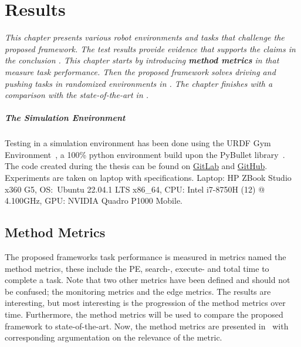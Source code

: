 \chapter{Results}%
\label{chap:results}
\textit{This chapter presents various robot environments and tasks that challenge the proposed framework. The test results provide evidence that supports the claims in the conclusion . This chapter starts by introducing \textbf{method metrics} in  that measure task performance. Then the proposed framework solves driving and pushing tasks in randomized environments in . The chapter finishes with a comparison with the state-of-the-art in .\bs}

\paragraph{The Simulation Environment}
Testing in a simulation environment has been done using the URDF Gym Environment~\cite{spahn_urdfenvironment_2022}, a 100\% python environment build upon the PyBullet library~\cite{coumans_pybullet_2016}. The code created during the thesis can be found on \href{https://gitlab.tudelft.nl/airlab-delft/msc_projects/msc_gijs_groote}{GitLab} and \href{https://github.com/GijsGroote/semantic-thinking-robot}{GitHub}. Experiments are taken on laptop with specifications. Laptop: HP ZBook Studio x360 G5, OS:~Ubuntu 22.04.1 LTS x86\_64, CPU: Intel i7-8750H (12) @ 4.100GHz, GPU: NVIDIA Quadro P1000 Mobile.\bs

\section{Method Metrics}%
\label{sec:proposed_method_metrics}
The proposed frameworks task performance is measured in metrics named the method metrics, these include the \ac{PE}, search-, execute- and total time to complete a task. Note that two other metrics have been defined and should not be confused; the monitoring metrics and the edge metrics. The results are interesting, but most interesting is the progression of the method metrics over time. Furthermore, the method metrics will be used to compare the proposed framework to state-of-the-art. Now, the method metrics are presented in~ with corresponding argumentation on the relevance of the metric.\bs

